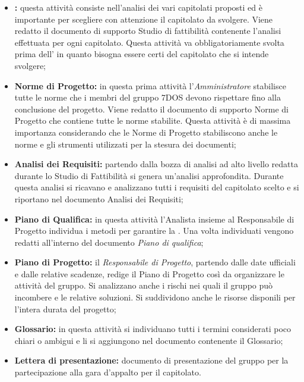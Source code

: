 \begin{itemize}

	\item \textbf{:} questa attività consiste nell'analisi dei vari capitolati proposti ed è importante per scegliere con attenzione il capitolato da svolgere. Viene redatto il documento di supporto Studio di fattibilità contenente l'analisi effettuata per ogni capitolato. Questa attività va obbligatoriamente svolta prima dell' in quanto bisogna essere certi del capitolato che si intende svolgere;

	\item \textbf{Norme di Progetto:} in questa prima attività l'\emph{Amministratore} stabilisce tutte le norme che i membri del gruppo 7DOS devono rispettare fino alla conclusione del progetto. Viene redatto il documento di supporto Norme di Progetto che contiene tutte le norme stabilite. Questa attività è di massima importanza considerando che le Norme di Progetto stabiliscono anche le norme e gli strumenti utilizzati per la stesura dei documenti;

	\item \textbf{Analisi dei Requisiti:} partendo dalla bozza di analisi ad alto livello redatta durante lo Studio di Fattibilità si genera un'analisi approfondita. Durante questa analisi si ricavano e analizzano tutti i requisiti del capitolato scelto e si riportano nel documento Analisi dei Requisiti;

	\item \textbf{Piano di Qualifica:} in questa attività l'Analista insieme al Responsabile di Progetto individua i metodi per garantire la . Una volta individuati vengono redatti all'interno del documento \textit{Piano di qualifica};

	\item \textbf{Piano di Progetto:} il \emph{Responsabile di Progetto}, partendo dalle date ufficiali e dalle relative scadenze, redige il Piano di Progetto così da organizzare le attività del gruppo. Si analizzano anche i rischi nei quali il gruppo può incombere e le relative soluzioni. Si suddividono anche le risorse disponili per l'intera durata del progetto;

	\item \textbf{Glossario:} in questa attività si individuano tutti i termini considerati poco chiari o ambigui e li si aggiungono nel documento contenente il Glossario;
	
	\item \textbf{Lettera di presentazione:} documento di presentazione del gruppo per la partecipazione alla gara d'appalto per il capitolato.

\end{itemize}

